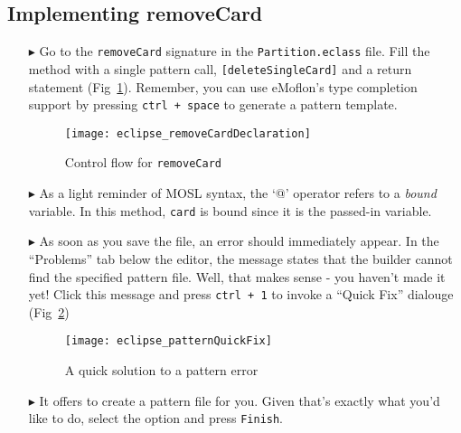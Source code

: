 \newpage
\hypertarget{remCard tex}{}
\subsection{Implementing removeCard}
\texHeader

\begin{itemize}

\item[$\blacktriangleright$] Go to the \texttt{removeCard} signature in the \texttt{Partition.eclass} file. Fill the method with a single pattern
call, \texttt{[deleteSingleCard]} and a return statement (Fig~\ref{fig:remCardDec}). Remember, you can use eMoflon's type completion support by pressing
\texttt{ctrl + space} to generate a pattern template.

\begin{figure}[htp]
\begin{center}
  \texttt{[image: eclipse\_removeCardDeclaration]}
  \caption{Control flow for \texttt{removeCard}}
  \label{fig:remCardDec}
\end{center}
\end{figure}

\item[$\blacktriangleright$] As a light reminder of MOSL syntax, the `@' operator refers to a \emph{bound} variable. In this method, \texttt{card} is bound
since it is the passed-in variable.

\item[$\blacktriangleright$] As soon as you save the file, an error should immediately appear. In the ``Problems'' tab below the editor, the message states that
the builder cannot find the specified pattern file. Well, that makes sense - you haven't made it yet! Click this message and press \texttt{ctrl + 1} to
invoke a ``Quick Fix'' dialouge (Fig~\ref{fig:quixFix})

\begin{figure}[htp]
\begin{center}
  \texttt{[image: eclipse\_patternQuickFix]}
  \caption{A quick solution to a pattern error}
  \label{fig:quixFix}
\end{center}
\end{figure}

\item[$\blacktriangleright$] It offers to create a pattern file for you. Given that's exactly what you'd like to do, select the option and press
\texttt{Finish}.

\newpage


\end{itemize}
